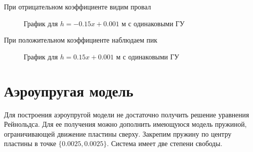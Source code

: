 \documentclass[a4paper,14pt]{extarticle}
\begin{document}
При отрицательном коэффициенте видим провал
\begin{figure}[!htbp]
	\caption{График для $h = -0.15 x + 0.001$ м с одинаковыми ГУ}
	\label{zero_neg}
\end{figure}
\newpage
При положительном коэффициенте наблюдаем пик
\begin{figure}[!htbp]
	\caption{График для $h = 0.15 x + 0.001$ м с одинаковыми ГУ}
	\label{zero_pos}
\end{figure}

\newpage

\section{Аэроупругая модель}
Для построения аэроупругой модели не достаточно получить решение уравнения Рейнольдса. Для ее получения можно дополнить имеющуюся модель пружиной, ограничивающей движение пластины сверху. Закрепим пружину по центру пластины в точке $\{0.0025, 0.0025\}$. Система имеет две степени свободы.
\end{document}
